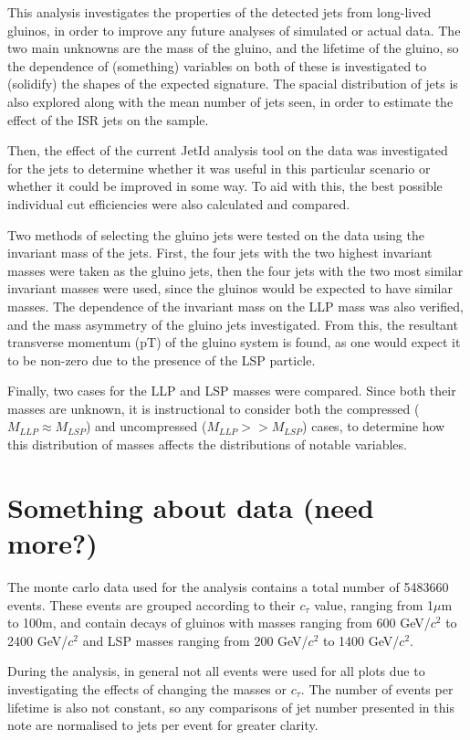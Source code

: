 \documentclass{article}
\begin{document}
This analysis investigates the properties of the detected jets from long-lived gluinos, in order to improve any future analyses of simulated or actual data. The two main unknowns are the mass of the gluino, and the lifetime of the gluino, so the dependence of (something) variables on both of these is investigated to (solidify) the shapes of the expected signature. The spacial distribution of jets is also explored along with the mean number of jets seen, in order to estimate the effect of the ISR jets on the sample. 

Then, the effect of the current JetId analysis tool on the data was investigated for the jets to determine whether it was useful in this particular scenario or whether it could be improved in some way. To aid with this, the best possible individual cut efficiencies were also calculated and compared.

Two methods of selecting the gluino jets were tested on the data using the invariant mass of the jets. First, the four jets with the two highest invariant masses were taken as the gluino jets, then the four jets with the two most similar invariant masses were used, since the gluinos would be expected to have similar masses. The dependence of the invariant mass on the LLP mass was also verified, and the mass asymmetry of the gluino jets investigated. From this, the resultant transverse momentum (pT) of the gluino system is found, as one would expect it to be non-zero due to the presence of the LSP particle. 
	
Finally, two cases for the LLP and LSP masses were compared. Since both their masses are unknown, it is instructional to consider both the compressed ($M_{LLP} \approx M_{LSP}$) and uncompressed ($M_{LLP} >> M_{LSP}$) cases, to determine how this distribution of masses affects the distributions of notable variables.  




\section*{Something about data (need more?)}
The monte carlo data used for the analysis contains a total number of 5483660 events. These events are grouped according to their $c_{\tau}$ value, ranging from 1$\mu$m to 100m, and contain decays of gluinos with masses ranging from 600 GeV/$c^{2}$ to 2400 GeV/$c^{2}$ and LSP masses ranging from 200 GeV/$c^{2}$ to 1400 GeV/$c^{2}$.

During the analysis, in general not all events were used for all plots due to investigating the effects of changing the masses or $c_{\tau}$. The number of events per lifetime is also not constant, so any comparisons of jet number presented in this note are normalised to jets per event for greater clarity.
\end{document}
